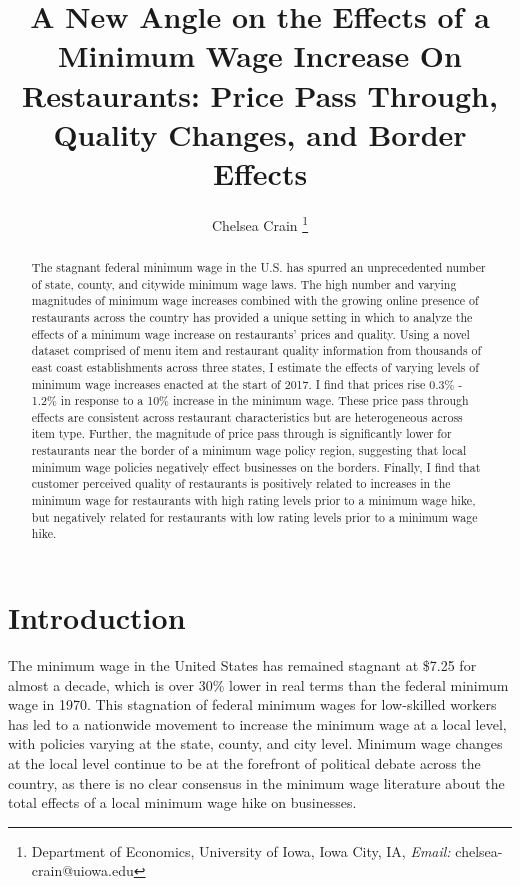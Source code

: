 \documentclass[11pt]{article}
\title{A New Angle on the Effects of a  Minimum Wage Increase On Restaurants:  Price Pass Through, Quality Changes, and Border Effects}
\author{Chelsea Crain \footnote{Department of Economics, University of Iowa, Iowa City, IA, \textit{Email: }chelsea-crain@uiowa.edu} }
\begin{document}
\maketitle

\begin{abstract}
The stagnant federal minimum wage in the U.S. has spurred an unprecedented number of state, county, and citywide minimum wage laws. The high number and varying magnitudes of minimum wage increases combined with the growing online presence of restaurants across the country has provided a unique setting in which to analyze the effects of a minimum wage increase on restaurants' prices and quality. Using a novel dataset comprised of menu item and restaurant quality information from thousands of east coast establishments across three states, I estimate the effects of varying levels of minimum wage increases enacted at the start of 2017. I find that prices rise 0.3\% - 1.2\% in response to a 10\% increase in the minimum wage. These price pass through effects are consistent across restaurant characteristics but are heterogeneous across item type. Further, the magnitude of price pass through is significantly lower for restaurants near the border of a minimum wage policy region, suggesting that local minimum wage policies negatively effect businesses on the borders. Finally, I find that customer perceived quality of restaurants is positively related to increases in the minimum wage for restaurants with high rating levels prior to a minimum wage hike, but negatively related for restaurants with low rating levels prior to a minimum wage hike. 


\end{abstract}

\newpage

\section{Introduction}
The minimum wage in the United States has remained stagnant at \$7.25 for almost a decade, which is over 30\% lower in real terms than the federal minimum wage in 1970. This stagnation of federal minimum wages for low-skilled workers has led to a nationwide movement to increase the minimum wage at a local level, with policies varying at the state, county, and city level. Minimum wage changes at the local level continue to be at the forefront of political debate across the country, as there is no clear consensus in the minimum wage literature about the total effects of a local minimum wage hike on businesses.  
\end{document}

